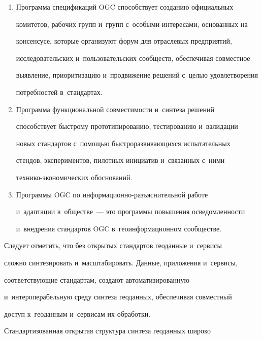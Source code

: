      \begin{enumerate}[1.]


\item Программа спецификаций OGC способствует созданию официальных 


комитетов, рабочих групп и~групп с~особыми интересами, основанных на 


консенсусе, которые организуют форум для отраслевых предприятий, 


исследовательских и~пользовательских сообществ, обеспечивая совместное 


выявление, приоритизацию и~продвижение решений с~\mbox{целью} удовле\-тво\-ре\-ния 


по\-треб\-но\-стей в~стандартах. 


\item Программа функциональной совместимости и~синтеза решений 


способствует быст\-ро\-му прототипированию, тестированию и~валидации 


новых стандартов с~по\-мощью быст\-ро\-раз\-ви\-ва\-ющих\-ся испытательных 


стендов, экспериментов, пилотных инициатив и~связанных с~ними  


тех\-ни\-ко-эко\-но\-ми\-че\-ских обоснований. 


\item Программы OGC по ин\-фор\-ма\-ци\-он\-но-разъ\-яс\-ни\-тель\-ной работе 


и~адап\-та\-ции в~обществе~--- это программы повышения осве\-дом\-лен\-ности 


и~внед\-ре\-ния стандартов OGC в~геоинформационном сообществе. 


\end{enumerate}





  Следует отметить, что без открытых стандартов геоданные и~сервисы 


слож\-но синтезировать и~масштабировать. Данные, приложения и~сервисы, 


соответствующие стандартам, создают автоматизированную 


и~интероперабельную среду синтеза геоданных, обеспечивая совместный 


доступ к~геоданным и~сервисам их обработки. 


  


  Стандартизованная открытая структура синтеза геоданных широко 


